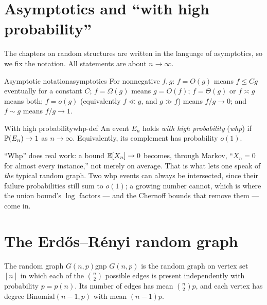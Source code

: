 \section{Asymptotics and ``with high probability''}

The chapters on random structures are written in the language of asymptotics, so
we fix the notation. All statements are about $n\to\infty$.

\begin{definition}{Asymptotic notation}{asymptotics}
For nonnegative $f,g$: $f=O(g)$ means $f\le Cg$ eventually for a constant $C$;
$f=\Omega(g)$ means $g=O(f)$; $f=\Theta(g)$ or $f\asymp g$ means both; $f=o(g)$
(equivalently $f\ll g$, and $g\gg f$) means $f/g\to0$; and $f\sim g$ means
$f/g\to1$.
\end{definition}

\begin{definition}{With high probability}{whp-def}
An event $E_n$ holds \emph{with high probability} (\emph{whp}) if
$\mathbb{P}(E_n)\to1$ as $n\to\infty$. Equivalently, its complement has probability
$o(1)$.
\end{definition}

\begin{insight}
``Whp'' does real work: a bound $\mathbb{E}[X_n]\to0$ becomes, through Markov,
``$X_n=0$ for almost every instance,'' not merely on average. That is what lets
one speak of \emph{the} typical random graph. Two whp events can always be
intersected, since their failure probabilities still sum to $o(1)$; a growing
number cannot, which is where the union bound's $\log$ factors --- and the
Chernoff bounds that remove them --- come in.
\end{insight}

\section{The Erd\H{o}s--R\'enyi random graph}

\begin{definition}{The random graph $G(n,p)$}{gnp}
$G(n,p)$ is the random graph on vertex set $[n]$ in which each of the $\binom n2$
possible edges is present independently with probability $p=p(n)$. Its number of
edges has mean $\binom n2 p$, and each vertex has degree
$\mathrm{Binomial}(n-1,p)$ with mean $(n-1)p$.
\end{definition}

